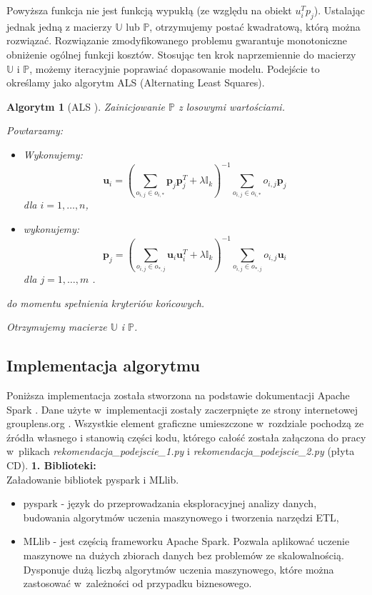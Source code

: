 \documentclass[12pt,a4paper]{report}
\newtheorem{algorytm}[df]{Algorytm}
\begin{document}
Powyższa funkcja nie jest funkcją wypukłą (ze względu na obiekt $u_i^Tp_j$). Ustalając jednak jedną z macierzy $\mathbb{U}$ lub $\mathbb{P}$, otrzymujemy postać kwadratową, którą można rozwiązać. Rozwiązanie zmodyfikowanego problemu gwarantuje monotoniczne obniżenie ogólnej funkcji kosztów. Stosując ten krok naprzemiennie do macierzy $\mathbb{U}$ i $\mathbb{P}$, możemy iteracyjnie poprawiać dopasowanie modelu. Podejście to określamy jako algorytm ALS (Alternating Least Squares).

\begin{algorytm}[ALS {\citep{mcvals}}]
Zainicjowanie $\mathbb{P}$ z losowymi wartościami.

Powtarzamy:
\begin{itemize}
\item Wykonujemy:
$$
\mathbf{u}_i = (\sum_{o_{i,j} \in o_{i,*}} \mathbf{p}_j \mathbf{p}_j^T + \lambda \mathbb{I}_k)^{-1} \sum_{o_{i,j} \in o_{i,*}} o_{i,j}\mathbf{p}_j
$$
dla $i = 1, \ldots, n $,
\item wykonujemy:
$$
\mathbf{p}_j = (\sum_{o_{i,j} \in o_{*,j}} \mathbf{u}_i \mathbf{u}_i^T + \lambda \mathbb{I}_k)^{-1} \sum_{o_{i,j} \in o_{*,j}} o_{i,j}\mathbf{u}_i
$$
dla $j = 1, \ldots, m$ .
\end{itemize}
do momentu spełnienia kryteriów końcowych.

Otrzymujemy macierze $\mathbb{U}$ i $\mathbb{P}$.
\end{algorytm}

\subsection{Implementacja algorytmu}
Poniższa implementacja została stworzona na podstawie dokumentacji Apache Spark {\citep{apache}}. Dane użyte w~implementacji zostały zaczerpnięte ze strony internetowej grouplens.org {\citep{dane}}. Wszystkie element graficzne umieszczone w~rozdziale pochodzą ze źródła własnego i stanowią części kodu, którego całość została załączona do pracy w~plikach \textit{rekomendacja\_podejscie\_1.py} i \textit{rekomendacja\_podejscie\_2.py} (płyta CD).
\bigskip
\textbf{1. Biblioteki:}
\\Załadowanie bibliotek pyspark i  MLlib.
\begin{itemize}
\item pyspark - język do przeprowadzania eksploracyjnej analizy danych, budowania algorytmów uczenia maszynowego i tworzenia narzędzi ETL,
\item MLlib - jest częścią frameworku Apache Spark. Pozwala aplikować uczenie maszynowe na dużych zbiorach danych bez problemów ze skalowalnością. Dysponuje dużą liczbą algorytmów uczenia maszynowego, które można zastosować w~zależności od przypadku biznesowego.
\end{itemize}
\end{document}
